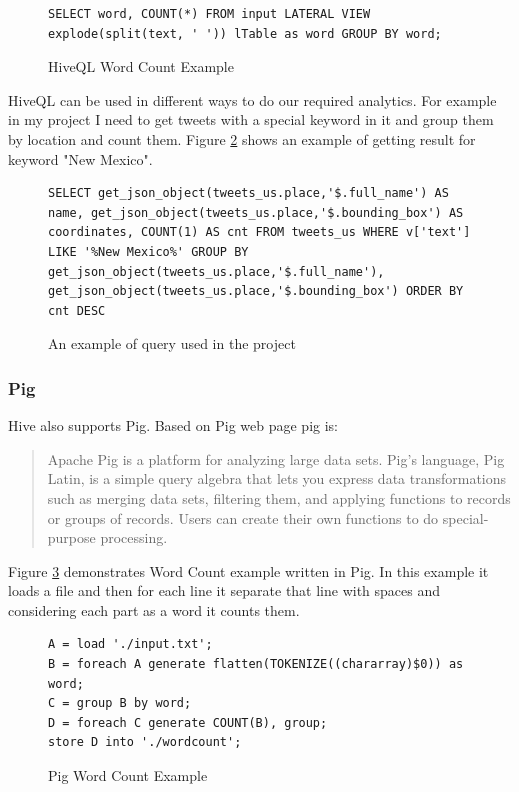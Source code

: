 \documentclass[a4paper,11pt]{report}
\begin{document}
\begin{figure}[!hbp]
\caption{HiveQL Word Count Example}
\begin{lstlisting}
SELECT word, COUNT(*) FROM input LATERAL VIEW explode(split(text, ' ')) lTable as word GROUP BY word;
\end{lstlisting}
\label{fig:hiveqlwordcount}
\end{figure}

HiveQL can be used in different ways to do our required analytics. For example in my project I need to get tweets with a special keyword in it and group them by location and count them. Figure \ref{fig:hiveqltweet} shows an example of getting result for keyword "New Mexico".

\begin{figure}[!hbp]
\caption{An example of query used in the project}
\begin{lstlisting}
SELECT get_json_object(tweets_us.place,'$.full_name') AS name, get_json_object(tweets_us.place,'$.bounding_box') AS coordinates, COUNT(1) AS cnt FROM tweets_us WHERE v['text'] LIKE '%New Mexico%' GROUP BY get_json_object(tweets_us.place,'$.full_name'), get_json_object(tweets_us.place,'$.bounding_box') ORDER BY cnt DESC
\end{lstlisting}
\label{fig:hiveqltweet}
\end{figure}

\subsubsection{Pig}

Hive also supports Pig. Based on Pig web page pig is:
\begin{quote}
Apache Pig is a platform for analyzing large data sets. Pig's language, Pig Latin, is a simple query algebra that lets you express data transformations such as merging data sets, filtering them, and applying functions to records or groups of records. Users can create their own functions to do special-purpose processing.
\end{quote}

Figure \ref{fig:hiveqlpig}  demonstrates Word Count example written in Pig. In this example it loads a file and then for each line it separate that line with spaces and considering each part as a word it counts them.

\begin{figure}[!hbp]
\caption{Pig Word Count Example}
\begin{lstlisting}
A = load './input.txt';
B = foreach A generate flatten(TOKENIZE((chararray)$0)) as word;
C = group B by word;
D = foreach C generate COUNT(B), group;
store D into './wordcount';
\end{lstlisting}
\label{fig:hiveqlpig}
\end{figure}
\end{document}
